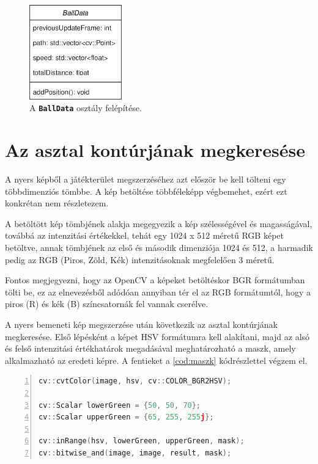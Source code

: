 \begin{figure}[!ht]
    \centering
    \includegraphics[width=40mm, keepaspectratio]{figures/balldata_class.png}
    \caption{A \textbf{\lstinline{BallData}} osztály felépítése.}
    \label{fig:balldata_class}
\end{figure}

\section{Az asztal kontúrjának megkeresése}
\label{section:megv_asztal_kontur}
A nyers képből a játékterület megszerzéséhez azt először be kell tölteni egy többdimenziós tömbbe. A kép betöltése többféleképp végbemehet, ezért ezt konkrétan nem részletezem.
\par A betöltött kép tömbjének alakja megegyezik a kép szélességével és magasságával, továbbá az intenzitási értékekkel, tehát egy 1024 x 512 méretű RGB képet betöltve, annak tömbjének az első és második dimenziója 1024 és 512, a harmadik pedig az RGB (Piros, Zöld, Kék) intenzitásoknak megfelelően 3 méretű.
\par Fontos megjegyezni, hogy az OpenCV a képeket betöltéskor BGR formátumban tölti be, ez az elnevezésből adódóan annyiban tér el az RGB formátumtól, hogy a piros (R) és kék (B) színcsatornák fel vannak cserélve.
\par A nyers bemeneti kép megszerzése után következik az asztal kontúrjának megkeresése. Első lépésként a képet HSV formátumra kell alakítani, majd az alsó és felső intenzitási értékhatárok megadásával meghatározható a maszk, amely alkalmazható az eredeti képre.
\newline A fentieket a \ref{cod:maszk} kódrészlettel végzem el.


\vspace{5mm}
\hspace{-10mm}
\begin{minipage}{\linewidth}
\begin{lstlisting}[language=C++, numbers=left, caption={A játékterület maszkolása.}, label={cod:maszk}]
cv::cvtColor(image, hsv, cv::COLOR_BGR2HSV);

cv::Scalar lowerGreen = {50, 50, 70};
cv::Scalar upperGreen = {65, 255, 255j};

cv::inRange(hsv, lowerGreen, upperGreen, mask);
cv::bitwise_and(image, image, result, mask);
\end{lstlisting}
\end{minipage}

